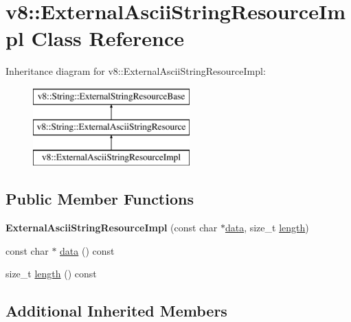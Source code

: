 \hypertarget{classv8_1_1ExternalAsciiStringResourceImpl}{\section{v8\-:\-:External\-Ascii\-String\-Resource\-Impl Class Reference}
\label{classv8_1_1ExternalAsciiStringResourceImpl}
}
Inheritance diagram for v8\-:\-:External\-Ascii\-String\-Resource\-Impl\-:\begin{figure}[H]
\begin{center}
\leavevmode
\includegraphics[height=3.000000cm]{classv8_1_1ExternalAsciiStringResourceImpl}
\end{center}
\end{figure}
\subsection*{Public Member Functions}
\begin{DoxyCompactItemize}
\item 
\hypertarget{classv8_1_1ExternalAsciiStringResourceImpl_ad43442534df30aebaf0125ba12aef925}{{\bfseries External\-Ascii\-String\-Resource\-Impl} (const char $\ast$\hyperlink{classv8_1_1ExternalAsciiStringResourceImpl_a39719832d6d06fbfd8a86cf1cd6f9d6f}{data}, size\-\_\-t \hyperlink{classv8_1_1ExternalAsciiStringResourceImpl_a8f37b80039c1ef29b0c755354a11424a}{length})}\label{classv8_1_1ExternalAsciiStringResourceImpl_ad43442534df30aebaf0125ba12aef925}

\item 
const char $\ast$ \hyperlink{classv8_1_1ExternalAsciiStringResourceImpl_a39719832d6d06fbfd8a86cf1cd6f9d6f}{data} () const 
\item 
size\-\_\-t \hyperlink{classv8_1_1ExternalAsciiStringResourceImpl_a8f37b80039c1ef29b0c755354a11424a}{length} () const 
\end{DoxyCompactItemize}
\subsection*{Additional Inherited Members}


